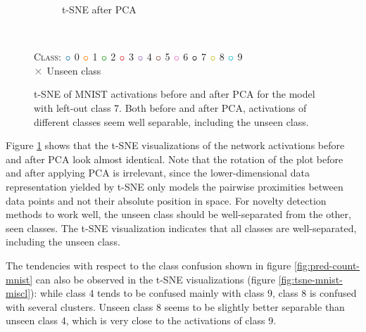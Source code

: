 \documentclass[10pt]{article}
\newcommand{\legendBulletMNIST}{
    \begin{minipage}[t]{0.5\textwidth}
    \centering
    \textsc{Class}:
    ${\color[rgb]{0.12, 0.47, 0.71}\boldsymbol{\circ}}$ 0
    ${\color[rgb]{1.0, 0.5, 0.05}\boldsymbol{\circ}}$ 1
    ${\color[rgb]{0.17, 0.63, 0.17}\boldsymbol{\circ}}$ 2
    ${\color[rgb]{0.84, 0.15, 0.16}\boldsymbol{\circ}}$ 3
    ${\color[rgb]{0.58, 0.4, 0.74}\boldsymbol{\circ}}$ 4
    ${\color[rgb]{0.55, 0.34, 0.29}\boldsymbol{\circ}}$ 5
    ${\color[rgb]{0.89, 0.47, 0.76}\boldsymbol{\circ}}$ 6
    ${\color[rgb]{0, 0, 0}\boldsymbol{\circ}}$ 7
    ${\color[rgb]{0.74, 0.74, 0.13}\boldsymbol{\circ}}$ 8
    ${\color[rgb]{0.09, 0.75, 0.81}\boldsymbol{\circ}}$ 9\\
    ${\color[rgb]{0.5, 0.5, 0.5}\boldsymbol{\times}}$ Unseen class
    \end{minipage}
    }
\begin{document}
\begin{figure}[H]
\begin{subfigure}{.5\textwidth}
        \caption{\gls{t-SNE} after \gls{PCA}}
    \end{subfigure}
    \\[.2cm]
    \legendBulletMNIST
    \caption{\gls{t-SNE} of \gls{MNIST} activations before and after \gls{PCA} for the model with left-out class 7. Both before and after \gls{PCA}, activations of different classes seem well separable, including the unseen class. }
    \label{fig:tsne-mnist}
\end{figure}

Figure \ref{fig:tsne-mnist} shows that the \gls{t-SNE} visualizations of the network activations before and after \gls{PCA} look almost identical. Note that the rotation of the plot before and after applying \gls{PCA} is irrelevant, since the lower-dimensional data representation yielded by \gls{t-SNE} only models the pairwise proximities between data points and not their absolute position in space. For novelty detection methods to work well, the unseen class should be well-separated from the other, seen classes. The t-SNE visualization indicates that all classes are well-separated, including the unseen class.

The tendencies with respect to the class confusion shown in figure \ref{fig:pred-count-mnist} can also be observed in the \gls{t-SNE} visualizations (figure \ref{fig:tsne-mnist-miscl}): while class 4 tends to be confused mainly with class 9, class 8 is confused with several clusters.  Unseen class 8 seems to be slightly better separable than unseen class 4, which is very close to the activations of class 9.
\end{document}
